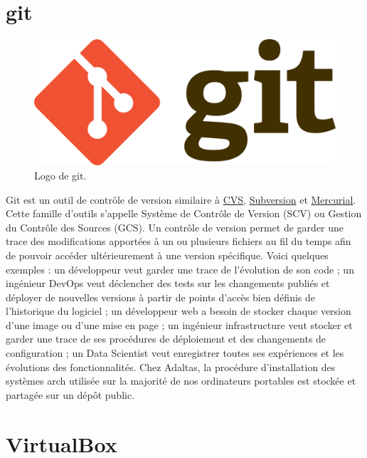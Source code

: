 \documentclass[12pt, french]{report}
\begin{document}
\section{git}

\begin{figure}[h]
\includegraphics[scale=0.1]{assets/img/logo-git.png}
\centering
\caption{Logo de git.}
\label{fig:logo-adaltas}
\end{figure}

Git est un outil de contrôle de version similaire à \href{https://en.wikipedia.org/wiki/Concurrent_Versions_System}{CVS}, \href{https://subversion.apache.org/}{Subversion} et \href{https://www.mercurial-scm.org/}{Mercurial}. Cette famille d'outils s'appelle Système de Contrôle de Version (SCV) ou Gestion du Contrôle des Sources (GCS). Un contrôle de version permet de garder une trace des modifications apportées à un ou plusieurs fichiers au fil du temps afin de pouvoir accéder ultérieurement à une version spécifique. Voici quelques exemples : un développeur veut garder une trace de l'évolution de son code ; un ingénieur DevOps veut déclencher des tests sur les changements publiés et déployer de nouvelles versions à partir de points d'accès bien définis de l'historique du logiciel ; un développeur web a besoin de stocker chaque version d'une image ou d'une mise en page ; un ingénieur infrastructure veut stocker et garder une trace de ses procédures de déploiement et des changements de configuration ; un Data Scientist veut enregistrer toutes ses expériences et les évolutions des fonctionnalités. Chez Adaltas, la procédure d'installation des systèmes \gls{arch} utilisée sur la majorité de nos ordinateurs portables est stockée et partagée sur un dépôt public.

\section{VirtualBox}
\end{document}
